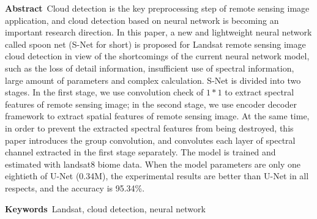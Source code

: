 \documentclass[10pt]{ctexart}
\begin{document}
\noindent\textbf{Abstract}\ Cloud detection is the key preprocessing step of remote sensing image application, and cloud detection based on neural network is becoming an important research direction. In this paper, a new and lightweight neural network called spoon net (S-Net for short) is proposed for Landsat remote sensing image cloud detection in view of the shortcomings of the current neural network model, such as the loss of detail information, insufficient use of spectral information, large amount of parameters and complex calculation. S-Net is divided into two stages. In the first stage, we use convolution check of $1 * 1$ to extract spectral features of remote sensing image; in the second stage, we use encoder decoder framework to extract spatial features of remote sensing image. At the same time, in order to prevent the extracted spectral features from being destroyed, this paper introduces the group convolution, and convolutes each layer of spectral channel extracted in the first stage separately. The model is trained and estimated with landsat8 biome data. When the model parameters are only one eightieth of U-Net (0.34M), the experimental results are better than U-Net in all respects, and the accuracy is 95.34\%.

\noindent\textbf{Keywords}\ Landsat, cloud detection, neural network
\end{document}
